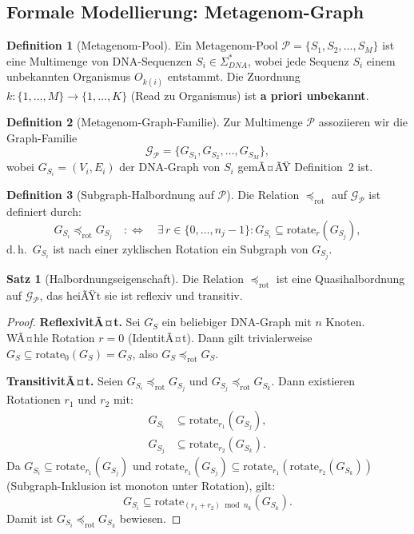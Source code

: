 ﻿\documentclass[a4paper,12pt]{article}
\theoremstyle{definition}
\newtheorem{definition}{Definition}
\newtheorem{satz}{Satz}
\begin{document}
\subsection{Formale Modellierung: Metagenom-Graph}

\begin{definition}[Metagenom-Pool]
	Ein Metagenom-Pool $\mathcal{P} = \{S_1, S_2, \ldots, S_M\}$ ist eine
	Multimenge von DNA-Sequenzen $S_i \in \Sigma_{DNA}^*$, wobei jede Sequenz
	$S_i$ einem unbekannten Organismus $O_{k(i)}$ entstammt. Die Zuordnung
	$k: \{1,\ldots,M\} \to \{1,\ldots,K\}$ (Read zu Organismus) ist
	\textbf{a priori unbekannt}.
\end{definition}

\begin{definition}[Metagenom-Graph-Familie]
	Zur Multimenge $\mathcal{P}$ assoziieren wir die Graph-Familie
	\[
	\mathcal{G}_{\mathcal{P}} = \{G_{S_1}, G_{S_2}, \ldots, G_{S_M}\},
	\]
	wobei $G_{S_i} = (V_i, E_i)$ der DNA-Graph von $S_i$ gemÃ¤ÃŸ Definition~2 ist.
\end{definition}

\begin{definition}[Subgraph-Halbordnung auf $\mathcal{P}$]
	\label{def:halbordnung}
	Die Relation $\preceq_{\mathrm{rot}}$ auf $\mathcal{G}_{\mathcal{P}}$ ist
	definiert durch:
	\[
	G_{S_i} \preceq_{\mathrm{rot}} G_{S_j}
	\quad :\Leftrightarrow \quad
	\exists\, r \in \{0,\ldots,n_j-1\}\colon
	G_{S_i} \subseteq \mathrm{rotate}_r(G_{S_j}),
	\]
	d.\,h.\ $G_{S_i}$ ist nach einer zyklischen Rotation ein Subgraph von $G_{S_j}$.
\end{definition}

\begin{satz}[Halbordnungseigenschaft]
	\label{satz:halbordnung}
	Die Relation $\preceq_{\mathrm{rot}}$ ist eine Quasihalbordnung auf
	$\mathcal{G}_{\mathcal{P}}$, das heiÃŸt sie ist reflexiv und transitiv.
\end{satz}

\begin{proof}
	\textbf{ReflexivitÃ¤t.}
	Sei $G_S$ ein beliebiger DNA-Graph mit $n$ Knoten.
	WÃ¤hle Rotation $r = 0$ (IdentitÃ¤t). Dann gilt trivialerweise
	$G_S \subseteq \mathrm{rotate}_0(G_S) = G_S$,
	also $G_S \preceq_{\mathrm{rot}} G_S$.
	
	\textbf{TransitivitÃ¤t.}
	Seien $G_{S_i} \preceq_{\mathrm{rot}} G_{S_j}$ und
	$G_{S_j} \preceq_{\mathrm{rot}} G_{S_k}$.
	Dann existieren Rotationen $r_1$ und $r_2$ mit:
	\begin{align*}
		G_{S_i} &\subseteq \mathrm{rotate}_{r_1}(G_{S_j}), \\
		G_{S_j} &\subseteq \mathrm{rotate}_{r_2}(G_{S_k}).
	\end{align*}
	Da $G_{S_i} \subseteq \mathrm{rotate}_{r_1}(G_{S_j})$ und
	$\mathrm{rotate}_{r_1}(G_{S_j}) \subseteq \mathrm{rotate}_{r_1}(\mathrm{rotate}_{r_2}(G_{S_k}))$
	(Subgraph-Inklusion ist monoton unter Rotation), gilt:
	\[
	G_{S_i} \subseteq \mathrm{rotate}_{(r_1 + r_2) \bmod n_k}(G_{S_k}).
	\]
	Damit ist $G_{S_i} \preceq_{\mathrm{rot}} G_{S_k}$ bewiesen. 
\end{proof}
\end{document}
